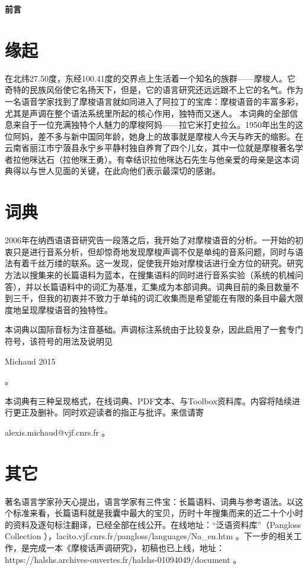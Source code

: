 \documentclass[oldfontcommands,oneside,a4paper,11pt]{article}
\newcommand{\zh}[1]{{\cn #1}}
\begin{document}
	\clearpage
	
	
	{\LARGE \textbf{\zh{前言}}}
	\section{ \zh{缘起}} \label{sec:language}
	
	\zh{ 在北纬27.50度，东经100.41度的交界点上生活着一个知名的族群——摩梭人。它奇特的民族风俗使它名扬天下，但是，它的语言研究还远远跟不上它的名气。作为一名语音学家找到了摩梭语言就如同进入了阿拉丁的宝库：摩梭语音的丰富多彩，尤其是声调在整个语法系统里所起的核心作用，独特而又迷人。
		本词典的全部信息来自于一位充满独特个人魅力的摩梭阿妈——拉它米打史拉么。1950年出生的这位阿妈，差不多与新中国同年龄，她身上的故事就是摩梭人今天与昨天的缩影。在云南省丽江市宁蒗县永宁乡平静村独自养育了四个儿女，其中一位就是摩梭著名学者拉他咪达石（拉他咪王勇）。有幸结识拉他咪达石先生与他亲爱的母亲是这本词典得以与世人见面的关键，在此向他们表示最深切的感谢。}
	
	\section{ \zh{词典}} \label{sec:method}
	
	\zh{2006年在纳西语语音研究告一段落之后，我开始了对摩梭语音的分析。一开始的初衷只是进行音系分析，但却惊奇地发现摩梭声调不仅是单纯的音系问题，同时与语法有着千丝万缕的联系。这一发现，促使我开始对摩梭话进行全方位的研究。研究方法以搜集来的长篇语料为蓝本，在搜集语料的同时进行音系实验（系统的机械问答），并以长篇语料中的词汇为基准，汇集成为本部词典。词典目前的条目数量不到三千，但我的初衷并不致力于单纯的词汇收集而是希望能在有限的条目中最大限度地呈现摩梭语音的独特性。
		
		本词典以国际音标为注音基础。声调标注系统由于比较复杂，因此启用了一套专门符号，该符号的用法及说明见}Michaud 2015\zh{。
		
		本词典有三种呈现格式，在线词典、PDF文本、与Toolbox资料库。内容将陆续进行更正及删补。同时欢迎读者的指正与批评。来信请寄}alexis.michaud@vjf.cnrs.fr \zh{。}
	
	\section{ \zh{其它}} \label{sec:other}
	
	\zh{著名语言学家孙天心提出，语言学家有三件宝：长篇语料、词典与参考语法。以这个标准来看，长篇语料就是我囊中最大的宝贝，历时十年搜集而来的近二十个小时的资料及逐句标注翻译，已经全部在线公开。在线地址：“泛语资料库”（}Pangloss Collection \zh{），}lacito.vjf.cnrs.fr/pangloss/languages/Na\_en.htm \zh{。下一步的相关工作，是完成一本《摩梭话声调研究》，初稿也已上线，地址：}https://halshs.archives-ouvertes.fr/halshs-01094049/document \zh{。}
	
\end{document}
